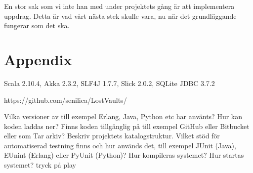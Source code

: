 \documentclass[a4paper]{article}
\begin{document}
En stor sak som vi inte han med under projektets gång är att implementera uppdrag. Detta är vad vårt nästa stek skulle vara, nu när det grundläggande fungerar som det ska. 

\section{Appendix}

Scala 2.10.4, Akka 2.3.2, SLF4J 1.7.7, Slick 2.0.2, SQLite JDBC 3.7.2

https://github.com/senilica/LostVaults/

Vilka versioner av till exempel Erlang, Java, Python etc har använts?
Hur kan koden laddas ner? Finns koden tillgänglig på till exempel GitHub eller Bitbucket eller som Tar arkiv?  Beskriv projektets katalogstruktur.
Vilket stöd för automatiserad testning finns och hur används det, till exempel JUnit (Java), EUnint (Erlang) eller PyUnit (Python)?
Hur kompileras systemet?
Hur startas systemet? tryck på play
\end{document}
